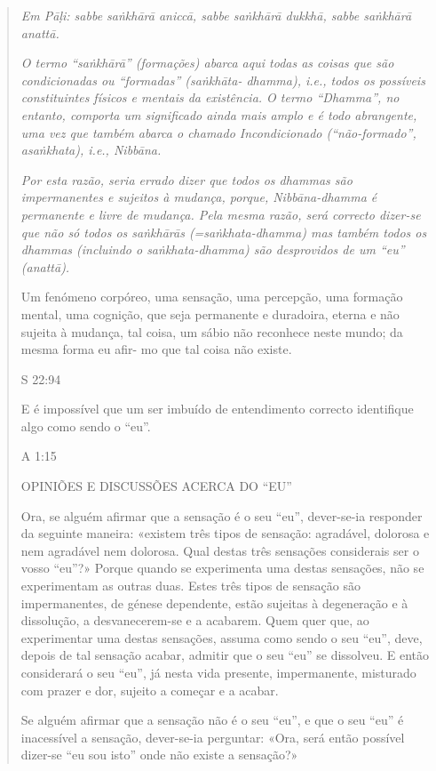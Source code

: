 \begin{quote}
\emph{Em Pāḷi: sabbe saṅkhārā aniccā, sabbe saṅkhārā dukkhā, sabbe saṅkhārā anattā.}

\emph{O termo ``saṅkhārā'' (formações) abarca aqui todas as coisas que são condicionadas ou ``formadas'' (saṅkhāta- dhamma), i.e., todos os possíveis constituintes físicos e mentais da existência. O termo ``Dhamma'', no entanto, comporta um significado ainda mais amplo e é todo abrangente, uma vez que também abarca o chamado Incondicionado (``não-formado'', asaṅkhata), i.e., Nibbāna.}

\emph{Por esta razão, seria errado dizer que todos os dhammas são impermanentes e sujeitos à mudança, porque, Nibbāna-dhamma é permanente e livre de mudança. Pela mesma razão, será correcto dizer-se que não só todos os saṅkhārās (=saṅkhata-dhamma) mas também todos os dhammas (incluindo o saṅkhata-dhamma) são desprovidos de um ``eu'' (anattā).}

Um fenómeno corpóreo, uma sensação, uma percepção, uma formação mental, uma cognição, que seja permanente e duradoira, eterna e não sujeita à mudança, tal coisa, um sábio não reconhece neste mundo; da mesma forma eu afir- mo que tal coisa não existe.

S 22:94

E é impossível que um ser imbuído de entendimento correcto identifique algo como sendo o ``eu''.

A 1:15

OPINIÕES E DISCUSSÕES ACERCA DO ``EU''

Ora, se alguém afirmar que a sensação é o seu ``eu'', dever-se-ia responder da seguinte maneira: «existem três tipos de sensação: agradável, dolorosa e nem agradável nem dolorosa. Qual destas três sensações considerais ser o vosso ``eu''?» Porque quando se experimenta uma destas sensações, não se experimentam as outras duas. Estes três tipos de sensação são impermanentes, de génese dependente, estão sujeitas à degeneração e à dissolução, a desvanecerem-se e a acabarem. Quem quer que, ao experimentar uma destas sensações, assuma como sendo o seu ``eu'', deve, depois de tal sensação acabar, admitir que o seu ``eu'' se dissolveu. E então considerará o seu ``eu'', já nesta vida presente, impermanente, misturado com prazer e dor, sujeito a começar e a acabar.

Se alguém afirmar que a sensação não é o seu ``eu'', e que o seu ``eu'' é inacessível a sensação, dever-se-ia perguntar: «Ora, será então possível dizer-se ``eu sou isto'' onde não existe a sensação?»


\end{quote}
